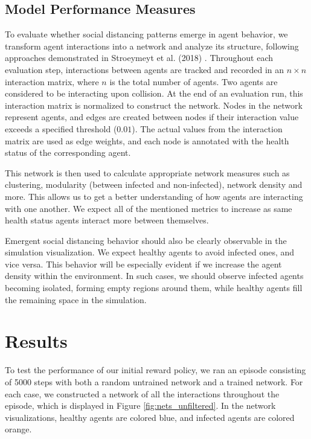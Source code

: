 \documentclass[9pt]{IEEEtran}
\begin{document}
\subsection{Model Performance Measures}

To evaluate whether social distancing patterns emerge in agent behavior, we transform agent interactions into a network and analyze its structure, following approaches demonstrated in Stroeymeyt et al. (2018) \cite{Stroeymeyt2018}. Throughout each evaluation step, interactions between agents are tracked and recorded in an $n \times n$ interaction matrix, where $n$ is the total number of agents. Two agents are considered to be interacting upon collision. At the end of an evaluation run, this interaction matrix is normalized to construct the network. Nodes in the network represent agents, and edges are created between nodes if their interaction value exceeds a specified threshold ($0.01$). The actual values from the interaction matrix are used as edge weights, and each node is annotated with the health status of the corresponding agent.

This network is then used to calculate appropriate network measures such as clustering, modularity (between infected and non-infected), network density and more. This allows us to get a better understanding of how agents are interacting with one another. We expect all of the mentioned metrics to increase as same health status agents interact more between themselves.

Emergent social distancing behavior should also be clearly observable in the simulation visualization. We expect healthy agents to avoid infected ones, and vice versa. This behavior will be especially evident if we increase the agent density within the environment. In such cases, we should observe infected agents becoming isolated, forming empty regions around them, while healthy agents fill the remaining space in the simulation.

\section{Results}

To test the performance of our initial reward policy, we ran an episode consisting of 5000 steps with both a random untrained network and a trained network. For each case, we constructed a network of all the interactions throughout the episode, which is displayed in Figure \ref{fig:nets_unfiltered}. In the network visualizations, healthy agents are colored blue, and infected agents are colored orange.
\end{document}
